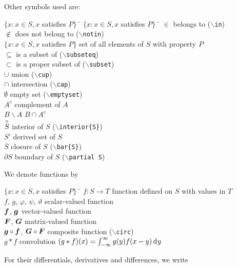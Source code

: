 \documentclass[11pt,dvips,a4paper]{article}
\newcommand{\hspacesymbols}%
   {$\{x: x \in S, x$ satisfies $P\}\;\;$} %
\newcommand{\type}[1]{{\tt$\backslash$#1}}
\begin{document}
Other symbols used are:
\begin{tabbing}
\hspacesymbols \= \hspacesymbols\qquad\quad \=  \kill
$\in$ \> belongs to (\type{in}) \\
$\notin$ \> does not belong to (\type{notin}) \\
$\{x: x \in S, x$ satisfies $P\}$ \> set of all elements of $S$ with
property $P$ \\
$\subseteq$ \> is a subset of (\type{subseteq}) \\
$\subset$ \> is a proper subset of (\type{subset}) \\
$\cup$ \> union  (\type{cup}) \\
$\cap$ \> intersection  (\type{cap}) \\
$\emptyset$ \> empty set (\type{emptyset})  \\
$A^{c}$ \> complement of $A$   \\
$B\backslash A$ \> $B\cap A^c$  \\
$\overset{\circ}{S}$ \> interior of $S$ (\type{interior\{S\}})   \\
$S'$ \> derived set of $S$   \\
$\bar{S}$ \> closure of $S$ (\type{bar\{S\}})  \\
$\partial S$ \> boundary of $S$ (\type{partial S})
\end{tabbing}
We denote functions by
\begin{tabbing}
\hspacesymbols \=   \kill
$f: S \to T$ \> function defined on $S$ with values in $T$   \\
$f$, $g$, $\varphi$, $\psi$, $\vartheta$ \> scalar-valued function   \\
$\bm f$, $\bm g$ \> vector-valued function   \\
$\bm F$, $\bm G$ \> matrix-valued function   \\
$\bm g \circ \bm f$, $\bm G \circ \bm F$ \> composite function (\type{circ}) \\
$g*f$ \> convolution $(g*f)(x)=\int_{-\infty}^{\infty}g(y)f(x-y)\rd y$
\end{tabbing}
For their differentials, derivatives and differences, we write
\end{document}
